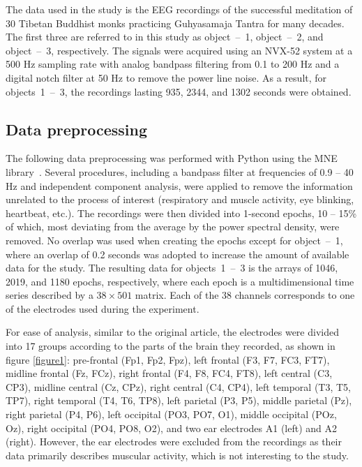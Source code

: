 \documentclass[10pt,lettersize,journal]{IEEEtran}
\begin{document}
The data used in the study is the EEG recordings of the successful meditation of 30 Tibetan Buddhist monks practicing Guhyasamaja Tantra for many decades. The first three are referred to in this study as object~\mbox{--}~1, object~\mbox{--}~2, and object~\mbox{--}~3, respectively. The signals were acquired using an NVX-52 system at a 500 Hz sampling rate with analog bandpass filtering from 0.1 to 200 Hz and a digital notch filter at 50 Hz to remove the power line noise. As a result, for objects~1~\mbox{--}~3, the recordings lasting 935, 2344, and 1302 seconds were obtained.

\subsection{Data preprocessing}

The following data preprocessing was performed with Python using the MNE library~\cite{MNE}. Several procedures, including a bandpass filter at frequencies of 0.9 -- 40 Hz and independent component analysis, were applied to remove the information unrelated to the process of interest (respiratory and muscle activity, eye blinking, heartbeat, etc.). The recordings were then divided into 1-second epochs, 10 -- 15\% of which, most deviating from the average by the power spectral density, were removed. No overlap was used when creating the epochs except for object~\mbox{--}~1, where an overlap of 0.2 seconds was adopted to increase the amount of available data for the study. The resulting data for objects~1~\mbox{--}~3 is the arrays of 1046, 2019, and 1180 epochs, respectively, where each epoch is a multidimensional time series described by a $38\times501$ matrix. Each of the 38 channels corresponds to one of the electrodes used during the experiment.

For ease of analysis, similar to the original article, the electrodes were divided into 17 groups according to the parts of the brain they recorded, as shown in figure \ref{figure1}: pre-frontal (Fp1, Fp2, Fpz), left frontal (F3, F7, FC3, FT7), midline frontal (Fz, FCz), right frontal (F4, F8, FC4, FT8), left central (C3, CP3), midline central (Cz, CPz), right central (C4, CP4), left temporal (T3, T5, TP7), right temporal (T4, T6, TP8), left parietal (P3, P5), middle parietal (Pz), right parietal (P4, P6), left occipital (PO3, PO7, O1), middle occipital (POz, Oz), right occipital (PO4, PO8, O2), and two ear electrodes A1 (left) and A2 (right). However, the ear electrodes were excluded from the recordings as their data primarily describes muscular activity, which is not interesting to the study.
\end{document}
